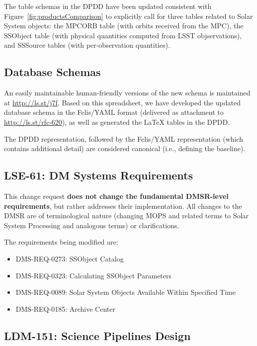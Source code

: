 \documentclass[DM,authoryear,toc,lsstdraft]{lsstdoc}
\begin{document}
The table schemas in the DPDD have been updated consistent with Figure~\ref{fig:productsComparison} to explicitly call for three tables related to Solar System objects: the MPCORB table (with orbits received from the MPC), the SSObject table (with physical quantities computed from LSST objservations), and SSSource tables (with per-observation quantities).

\subsection{Database Schemas}

An easily maintainable human-friendly versions of the new schema is maintained at \url{http://ls.st/j7f}. Based on this spreadsheet, we have developed the updated database schema in the Felis/YAML format (delivered as attachment to \url{http://ls.st/rfc-620}), as well as generated the \LaTeX{} tables in the DPDD.

The DPDD representation, followed by the Felis/YAML representation (which contains additional detail) are considered canonical (i.e., defining the baseline).

\subsection{LSE-61: DM Systems Requirements}

This change request {\bf does not change the fundamental DMSR-level requirements}, but rather addresses their implementation. All changes to the DMSR are of terminological nature (changing MOPS and related terms to Solar System Processing and analogous terms) or clarifications.

The requirements being modified are:
\begin{itemize}
	\item DMS-REQ-0273: SSObject Catalog
	\item DMS-REQ-0323: Calculating SSObject Parameters
	\item DMS-REQ-0089: Solar System Objects Available Within Specified Time
	\item DMS-REQ-0185: Archive Center
\end{itemize}

\subsection{LDM-151: Science Pipelines Design}
\end{document}
